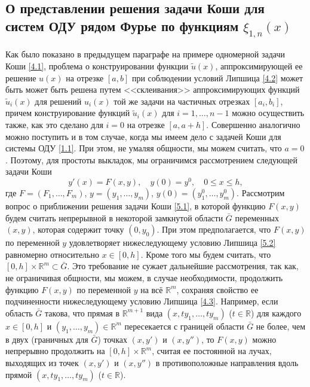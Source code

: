 \documentclass{article}
\numberwithin{equation}{section}
\theoremstyle{plain}
\theoremstyle{definition}
\begin{document}
\begin{fulltext}
\section{О представлении решения задачи Коши для систем ОДУ рядом Фурье по функциям $\xi_{1,n}(x)$}\label{s5}

Как было показано в предыдущем параграфе на примере одномерной задачи Коши \eqref{4.1}, проблема о конструировании  функции
$\tilde u(x)$, аппроксимирующей ее решение  $u(x)$ на отрезке $[a,b]$ при соблюдении условий Липшица \eqref{4.2} может быть может быть решена путем <<склеивания>> аппроксимирующих функций $\tilde u_i(x)$ для решений $u_i(x)$  той же задачи на частичных отрезках $[a_i,b_i]$, причем конструирование функций $\tilde u_i(x)$ для $i=1,\ldots, n-1$ можно осуществить также, как это сделано для $i=0$ на отрезке $[a,a+h]$. Совершенно аналогично можно поступить и в том случае, когда мы имеем дело с  задачей Коши для системы ОДУ \eqref{1.1}. При этом, не умаляя общности, мы можем считать, что $a=0$. Поэтому, для простоты выкладок, мы ограничимся рассмотрением следующей задачи Коши
\begin{equation}\label{5.1}
y'(x)=F(x,y), \quad y(0)=y^0,\quad 0\le x\le h,
\end{equation}
где $F=(F_1,\ldots,F_m)$, $y=(y_1,\ldots,y_m)$, $y(0)=(y_1^0,\ldots,y_m^0)$.  Рассмотрим вопрос о приближении решения задачи Коши \eqref{5.1},  в которой функцию   $F(x,y)$  будем считать непрерывной в некоторой замкнутой  области $\bar G$ переменных $(x,y)$,  которая содержит точку $(0,y_0)$. При этом предполагается, что   $F(x,y)$ по переменной $y$ удовлетворяет нижеследующему условию Липшица \eqref{5.2} равномерно относительно  $x\in[0,h]$. Кроме того мы будем считать, что $[0,h]\times\mathbb{R}^m\subset\bar G$. Это требование не сужает дальнейшие рассмотрения, так как, не ограничивая  общности,  мы можем, в случае необходимости, продолжить функцию $F(x,y)$ по переменной $y$ на всё $\mathbb{R}^m$, сохраняя свойство ее подчиненности  нижеследующему условию Липшица \eqref{4.3}. Например, если область $\bar G$ такова, что  прямая в $\mathbb{R}^{m+1}$ вида $(x,ty_1,\ldots,ty_m)$ ($t\in\mathbb{R}$) для каждого $x\in[0,h]$ и $(y_1,\ldots,y_m)\in\mathbb{R}^{m}$ пересекается с границей области $\bar G$ не более, чем в двух (граничных для $\bar G$) точках $(x,y')$ и $(x,y'')$, то  $F(x,y)$ можно непрерывно продолжить   на $[0,h]\times\mathbb{R}^m$, считая ее  постоянной на лучах, выходящих из точек  $(x,y')$ и $(x,y'')$ в противоположные направления вдоль прямой $(x,ty_1,\ldots,ty_m)$ ($t\in\mathbb{R}$).


\end{fulltext}
\end{document}
